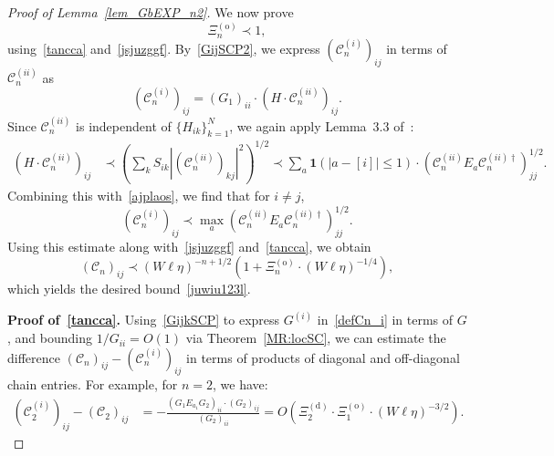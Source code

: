 \documentclass[10pt,reqno]{article}
\theoremstyle{plain} %
\theoremstyle{remark}
\numberwithin{equation}{section}
\begin{document}
\begin{proof}[Proof of Lemma~\ref{lem_GbEXP_n2}]
We now  prove
\begin{equation}\label{juwiu123l}
    \Xi^{(\mathrm{o})}_n \prec 1,
\end{equation}
using~\eqref{tancca} and~\eqref{jsjuzggf}. By~\eqref{GijSCP2}, we express \( \left( \mathcal{C}_n^{(i)} \right)_{ij} \) in terms of \( \mathcal{C}_n^{(ii)} \) as
\begin{equation}\label{ajplaos}
\left( \mathcal{C}_n^{(i)} \right)_{ij} = (G_1)_{ii} \cdot \left( H \cdot \mathcal{C}_n^{(ii)} \right)_{ij}.
\end{equation}
Since \( \mathcal{C}_n^{(ii)} \) is independent of \( \{ H_{ik} \}_{k=1}^N \), we again apply Lemma~3.3 of~\cite{erdHos2012rigidity}:
\begin{align}\label{lkjdsaos}
\left( H \cdot \mathcal{C}_n^{(ii)} \right)_{ij}
&\prec \left( \sum_k S_{ik} \left| \left( \mathcal{C}_n^{(ii)} \right)_{kj} \right|^2 \right)^{1/2}
\prec \sum_a \mathbf{1}(|a - [i]| \le 1) \cdot \left( \mathcal{C}_n^{(ii)} E_a \mathcal{C}_n^{(ii)\dagger} \right)_{jj}^{1/2}.
\end{align}
Combining this with~\eqref{ajplaos}, we find that for \( i \ne j \),
\begin{equation}\label{bCimmax}
\left( \mathcal{C}_n^{(i)} \right)_{ij} \prec \max_a \left( \mathcal{C}_n^{(ii)} E_a \mathcal{C}_n^{(ii)\dagger} \right)_{jj}^{1/2}.
\end{equation}
Using this estimate along with~\eqref{jsjuzggf} and~\eqref{tancca}, we obtain
\[
\left( \mathcal{C}_n \right)_{ij} \prec (W \ell \eta)^{-n + 1/2} \left( 1 + \Xi_n^{(\mathrm{o})} \cdot (W \ell \eta)^{-1/4} \right),
\]
which yields the desired bound~\eqref{juwiu123l}.


  
 
 
  
  
 

\medskip
\noindent
\textbf{Proof of~\eqref{tancca}.} Using~\eqref{GijkSCP} to express \( G^{(i)} \) in~\eqref{defCn_i} in terms of \( G \), and bounding \( 1/G_{ii} = O(1) \) via Theorem~\ref{MR:locSC}, we can estimate the difference \( \left( \mathcal{C}_n \right)_{ij} - \left( \mathcal{C}^{(i)}_n \right)_{ij} \) in terms of products of diagonal and off-diagonal chain entries. For example, for \( n = 2 \), we have:
\begin{align}
\left( \mathcal{C}^{(i)}_2 \right)_{ij} - \left( \mathcal{C}_2 \right)_{ij}
&= -\frac{\left( G_1 E_{a_1} G_2 \right)_{ii} \cdot (G_2)_{ij}}{(G_2)_{ii}} 
= O\left( \Xi^{(\mathrm{d})}_2 \cdot \Xi^{(\mathrm{o})}_1 \cdot (W \ell \eta)^{-3/2} \right).
\end{align}


\end{proof}
\end{document}
